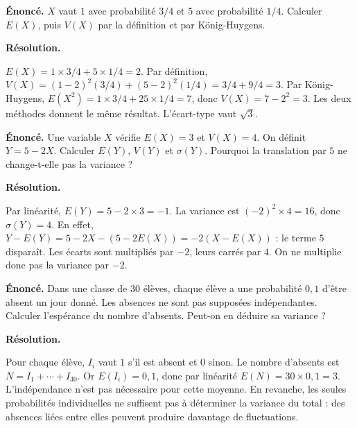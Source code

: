 \documentclass[11pt,a4paper]{article}
\begin{document}
\par\noindent\begin{minipage}{\linewidth}
{\small\color{Muted}\textbf{Énoncé.} $X$ vaut $1$ avec probabilité $3/4$ et $5$ avec probabilité $1/4$. Calculer $E(X)$, puis $V(X)$ par la définition et par König-Huygens.}
\par\medskip
\textbf{Résolution.}\par
$E(X)=1\times3/4+5\times1/4=2$. Par définition, $V(X)=(1-2)^2(3/4)+(5-2)^2(1/4)=3/4+9/4=3$. Par König-Huygens, $E(X^2)=1\times3/4+25\times1/4=7$, donc $V(X)=7-2^2=3$. Les deux méthodes donnent le même résultat. L’écart-type vaut $\sqrt3$.
\end{minipage}\par
\par\noindent\begin{minipage}{\linewidth}
{\small\color{Muted}\textbf{Énoncé.} Une variable $X$ vérifie $E(X)=3$ et $V(X)=4$. On définit $Y=5-2X$. Calculer $E(Y)$, $V(Y)$ et $\sigma(Y)$. Pourquoi la translation par $5$ ne change-t-elle pas la variance ?}
\par\medskip
\textbf{Résolution.}\par
Par linéarité, $E(Y)=5-2\times3=-1$. La variance est $(-2)^2\times4=16$, donc $\sigma(Y)=4$. En effet, $Y-E(Y)=5-2X-(5-2E(X))=-2(X-E(X))$ : le terme $5$ disparaît. Les écarts sont multipliés par $-2$, leurs carrés par $4$. On ne multiplie donc pas la variance par $-2$.
\end{minipage}\par
\par\noindent\begin{minipage}{\linewidth}
{\small\color{Muted}\textbf{Énoncé.} Dans une classe de $30$ élèves, chaque élève a une probabilité $0,1$ d’être absent un jour donné. Les absences ne sont pas supposées indépendantes. Calculer l’espérance du nombre d’absents. Peut-on en déduire sa variance ?}
\par\medskip
\textbf{Résolution.}\par
Pour chaque élève, $I_i$ vaut $1$ s’il est absent et $0$ sinon. Le nombre d’absents est $N=I_1+\cdots+I_{30}$. Or $E(I_i)=0,1$, donc par linéarité $E(N)=30\times0,1=3$. L’indépendance n’est pas nécessaire pour cette moyenne. En revanche, les seules probabilités individuelles ne suffisent pas à déterminer la variance du total : des absences liées entre elles peuvent produire davantage de fluctuations.
\end{minipage}\par
\end{document}
